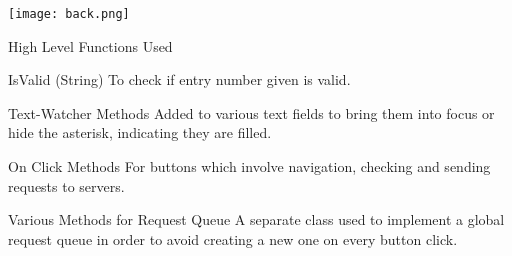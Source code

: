 \documentclass{beamer}
\begin{document}
{\usebackgroundtemplate%
{\texttt{[image: back.png]}}

\begin{frame}{High Level Functions Used }
\begin{block}{IsValid (String)}
To check if entry number given is valid.
\end{block}
\begin{block}{Text-Watcher Methods}
Added to various text fields to bring them into focus or hide the asterisk, indicating they are filled.
\end{block}
\begin{block}{On Click Methods}
For buttons which involve navigation, checking and sending requests to servers.
\end{block}
\begin{block}{Various Methods for Request Queue}
A separate class used to implement a global request queue in order to avoid creating a new one on every button click.
\end{block}


\end{frame}
}
\end{document}
